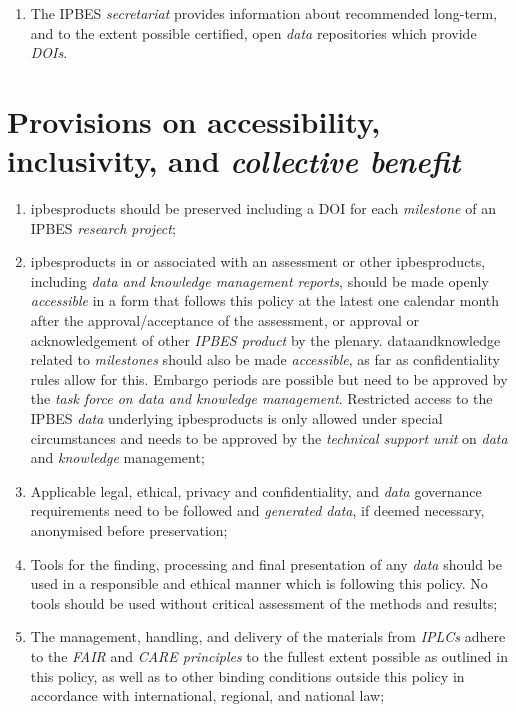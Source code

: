 \documentclass{article}
\begin{document}
\begin{enumerate}[label=(\alph*)]
    \item The IPBES \textit{secretariat} provides information about recommended long-term, and to the extent possible certified, open \textit{data} repositories which provide \textit{DOIs}.
\end{enumerate}



\section{Provisions on accessibility, inclusivity, and \textit{collective benefit}}

\begin{enumerate}[label=(\alph*)]
    \item \gls{ipbesproducts} should be preserved including a \gls{DOI} for each \textit{milestone }of an IPBES \textit{research project};

    \item \gls{ipbesproducts} in or associated with an assessment or other \gls{ipbesproducts}, including \textit{data and knowledge management reports}, should be made openly \textit{accessible} in a form that follows this policy at the latest one calendar month after the approval/acceptance of the assessment, or approval or acknowledgement of other \textit{IPBES product} by the \gls{plenary}. \gls{dataandknowledge} related to \textit{milestones} should also be made \textit{accessible}, as far as confidentiality rules allow for this. Embargo periods are possible but need to be approved by the \textit{task force on data and knowledge management}. Restricted access to the IPBES \textit{data} underlying \gls{ipbesproducts} is only allowed under special circumstances and needs to be approved by the \textit{technical support unit} on \textit{data} and \textit{knowledge} management;

    \item Applicable legal, ethical, privacy and confidentiality, and \textit{data} governance requirements need to be followed and \textit{generated data}, if deemed necessary, anonymised before preservation;

    \item Tools for the finding, processing and final presentation of any \textit{data} should be used in a responsible and ethical manner which is following this policy. No tools should be used without critical assessment of the methods and results;

    \item The management, handling, and delivery of the materials from \textit{IPLCs} adhere to the \textit{FAIR }and \textit{CARE principles} to the fullest extent possible as outlined in this policy, as well as to other binding conditions outside this policy in accordance with international, regional, and national law;


\end{enumerate}
\end{document}
